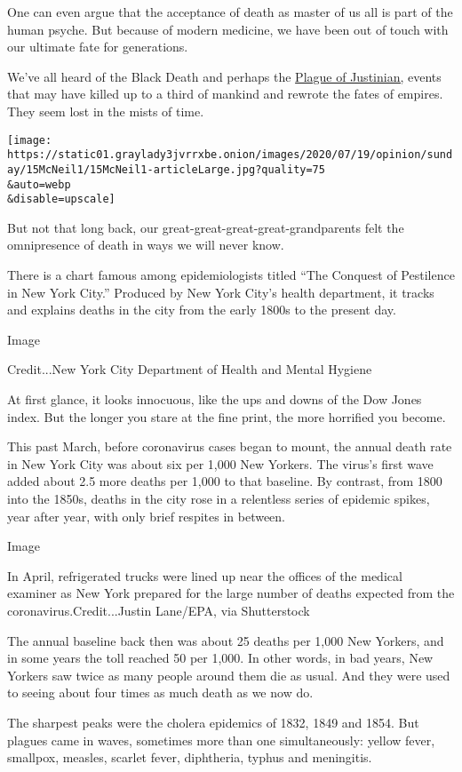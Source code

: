 One can even argue that the acceptance of death as master of us all is
part of the human psyche. But because of modern medicine, we have been
out of touch with our ultimate fate for generations.

We've all heard of the Black Death and perhaps the
\href{https://www.ancient.eu/article/782/justinians-plague-541-542-ce/}{Plague
of Justinian,} events that may have killed up to a third of mankind and
rewrote the fates of empires. They seem lost in the mists of time.

\texttt{[image: https://static01.graylady3jvrrxbe.onion/images/2020/07/19/opinion/sunday/15McNeil1/15McNeil1-articleLarge.jpg?quality=75\\\&auto=webp\\\&disable=upscale]}

But not that long back, our great-great-great-great-grandparents felt
the omnipresence of death in ways we will never know.

There is a chart famous among epidemiologists titled ``The Conquest of
Pestilence in New York City.'' Produced by New York City's health
department, it tracks and explains deaths in the city from the early
1800s to the present day.

Image

Credit...New York City Department of Health and Mental Hygiene

At first glance, it looks innocuous, like the ups and downs of the Dow
Jones index. But the longer you stare at the fine print, the more
horrified you become.

This past March, before coronavirus cases began to mount, the annual
death rate in New York City was about six per 1,000 New Yorkers. The
virus's first wave added about 2.5 more deaths per 1,000 to that
baseline. By contrast, from 1800 into the 1850s, deaths in the city rose
in a relentless series of epidemic spikes, year after year, with only
brief respites in between.

Image

In April, refrigerated trucks were lined up near the offices of the
medical examiner as New York prepared for the large number of deaths
expected from the coronavirus.Credit...Justin Lane/EPA, via Shutterstock

The annual baseline back then was about 25 deaths per 1,000 New Yorkers,
and in some years the toll reached 50 per 1,000. In other words, in bad
years, New Yorkers saw twice as many people around them die as usual.
And they were used to seeing about four times as much death as we now
do.

The sharpest peaks were the cholera epidemics of 1832, 1849 and 1854.
But plagues came in waves, sometimes more than one simultaneously:
yellow fever, smallpox, measles, scarlet fever, diphtheria, typhus and
meningitis.

